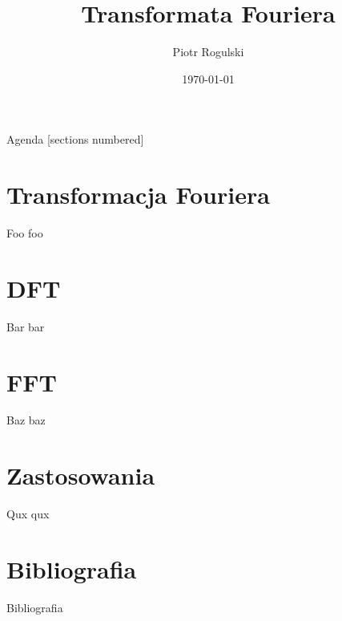 \documentclass[polish, 12pt, aspectratio=169]{beamer}
\title{Transformata Fouriera}
\author{Piotr Rogulski}
\date{\today}
\begin{document}
\frame{\titlepage}

\begin{frame}{Agenda}
    [sections numbered]
    \tableofcontents
\end{frame}

\section{Transformacja Fouriera}

\begin{frame}{Foo}
foo
\end{frame}

\section[DFT \\ {\normalsize Discrete Fourier Transform}]{DFT}

\begin{frame}{Bar}
bar
\end{frame}

\section[FFT \\ {\normalsize Fast Fourier Transform}]{FFT}

\begin{frame}{Baz}
baz
\end{frame}

\section{Zastosowania}

\begin{frame}{Qux}
qux
\end{frame}

\section*{Bibliografia}

\begin{frame}[allowframebreaks]{Bibliografia}
    \nocite{*}
    \printbibliography[heading=none]
\end{frame}
\end{document}
